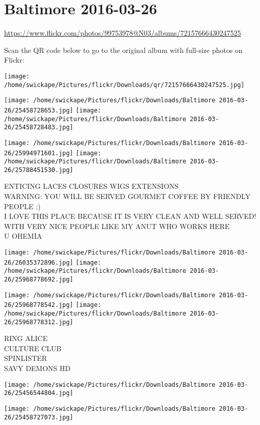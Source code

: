 \documentclass[10pt,letterpaper]{article}
\title{}
\author{}
\date{}
\begin{document}
\section*{Baltimore 2016-03-26}

\url{https://www.flickr.com/photos/99753978@N03/albums/72157666430247525}

Scan the QR code below to go to the original album with full-size photos on Flickr:

\texttt{[image: /home/swickape/Pictures/flickr/Downloads/qr/72157666430247525.jpg]}
\pagebreak

\texttt{[image: /home/swickape/Pictures/flickr/Downloads/Baltimore 2016-03-26/25458728653.jpg]}
\texttt{[image: /home/swickape/Pictures/flickr/Downloads/Baltimore 2016-03-26/25458728483.jpg]}

\texttt{[image: /home/swickape/Pictures/flickr/Downloads/Baltimore 2016-03-26/25994971601.jpg]}
\texttt{[image: /home/swickape/Pictures/flickr/Downloads/Baltimore 2016-03-26/25788451530.jpg]}

ENTICING LACES CLOSURES WIGS EXTENSIONS\\
WARNING: YOU WILL BE SERVED GOURMET COFFEE BY FRIENDLY PEOPLE :)\\
I LOVE THIS PLACE BECAUSE IT IS VERY CLEAN AND WELL SERVED!  WITH VERY NICE PEOPLE LIKE MY ANUT WHO WORKS HERE\\
U OHEMIA
\pagebreak

\texttt{[image: /home/swickape/Pictures/flickr/Downloads/Baltimore 2016-03-26/26035372896.jpg]}
\texttt{[image: /home/swickape/Pictures/flickr/Downloads/Baltimore 2016-03-26/25968778692.jpg]}

\texttt{[image: /home/swickape/Pictures/flickr/Downloads/Baltimore 2016-03-26/25968778542.jpg]}
\texttt{[image: /home/swickape/Pictures/flickr/Downloads/Baltimore 2016-03-26/25968778312.jpg]}

RING ALICE\\
CULTURE CLUB\\
SPINLISTER\\
SAVY DEMONS HD
\pagebreak

\texttt{[image: /home/swickape/Pictures/flickr/Downloads/Baltimore 2016-03-26/25456544804.jpg]}

\vspace{0.25in}
\texttt{[image: /home/swickape/Pictures/flickr/Downloads/Baltimore 2016-03-26/25458727073.jpg]}
\end{document}
